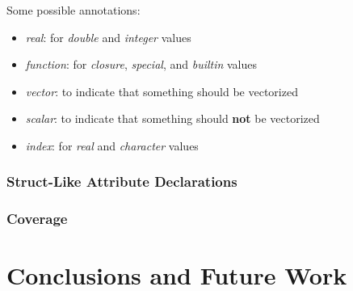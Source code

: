 \documentclass[acmsmall,10pt,review,anonymous]{acmart}\settopmatter{printfolios=true,printccs=false,printacmref=false}
\begin{document}
Some possible annotations:

\begin{itemize}
    \item \textit{real}: for \textit{double} and \textit{integer} values
    \item \textit{function}: for \textit{closure}, \textit{special}, and \textit{builtin} values
    \item \textit{vector}: to indicate that something should be vectorized
    \item \textit{scalar}: to indicate that something should \textbf{not} be vectorized
    \item \textit{index}: for \textit{real} and \textit{character} values
\end{itemize}

%
%
\subsubsection{Struct-Like Attribute Declarations}


%
\subsubsection{Coverage}


\section{Conclusions and Future Work}



\end{document}
